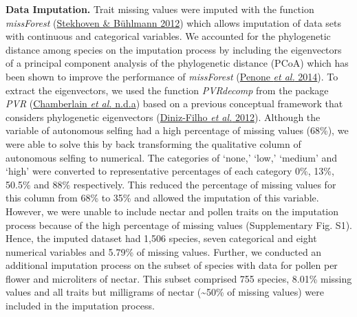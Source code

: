 \documentclass[
  12pt,
  a4paper,
]{article}
\begin{document}
\textbf{Data Imputation.} Trait missing values were imputed with the function \emph{missForest} (\protect\hyperlink{ref-stekhoven2012}{Stekhoven \& Bühlmann 2012}) which allows imputation of data sets with continuous and categorical variables. We accounted for the phylogenetic distance among species on the imputation process by including the eigenvectors of a principal component analysis of the phylogenetic distance (PCoA) which has been shown to improve the performance of \emph{missForest} (\protect\hyperlink{ref-penone2014}{Penone \emph{et al.} 2014}). To extract the eigenvectors, we used the function \emph{PVRdecomp} from the package \emph{PVR} (\protect\hyperlink{ref-santos2018}{Chamberlain \emph{et al.} n.d.a}) based on a previous conceptual framework that considers phylogenetic eigenvectors (\protect\hyperlink{ref-diniz-filho2012}{Diniz-Filho \emph{et al.} 2012}). Although the variable of autonomous selfing had a high percentage of missing values (68\%), we were able to solve this by back transforming the qualitative column of autonomous selfing to numerical. The categories of `none,' `low,' `medium' and `high' were converted to representative percentages of each category 0\%, 13\%, 50.5\% and 88\% respectively. This reduced the percentage of missing values for this column from 68\% to 35\% and allowed the imputation of this variable. However, we were unable to include nectar and pollen traits on the imputation process because of the high percentage of missing values (Supplementary Fig. S1). Hence, the imputed dataset had 1,506 species, seven categorical and eight numerical variables and 5.79\% of missing values. Further, we conducted an additional imputation process on the subset of species with data for pollen per flower and microliters of nectar. This subset comprised 755 species, 8.01\% missing values and all traits but milligrams of nectar (\textasciitilde50\% of missing values) were included in the imputation process.
\end{document}
